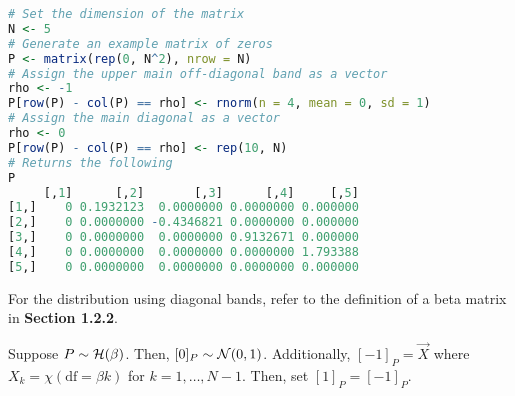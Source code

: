 \begin{lstlisting}[language=R]
# Set the dimension of the matrix
N <- 5
# Generate an example matrix of zeros
P <- matrix(rep(0, N^2), nrow = N)
# Assign the upper main off-diagonal band as a vector
rho <- -1
P[row(P) - col(P) == rho] <- rnorm(n = 4, mean = 0, sd = 1)
# Assign the main diagonal as a vector
rho <- 0
P[row(P) - col(P) == rho] <- rep(10, N)
# Returns the following
P
     [,1]      [,2]       [,3]      [,4]     [,5]
[1,]    0 0.1932123  0.0000000 0.0000000 0.000000
[2,]    0 0.0000000 -0.4346821 0.0000000 0.000000
[3,]    0 0.0000000  0.0000000 0.9132671 0.000000
[4,]    0 0.0000000  0.0000000 0.0000000 1.793388
[5,]    0 0.0000000  0.0000000 0.0000000 0.000000
\end{lstlisting}


%
%

For the distribution using diagonal bands, refer to the definition of a beta matrix in \textbf{Section 1.2.2}.

\ALGbeta

\begin{definition}
Suppose $P \sim \mathcal{H}(\beta)$. Then, $[0]_P \sim \mathcal{N}(0,1)$. Additionally, $[-1]_{P} = \vec{X}$ where $X_k = \chi(\text{df} = \beta k)$ for $k = 1,\dots,N-1$. Then, set $[1]_P = [-1]_P$.
\end{definition}


